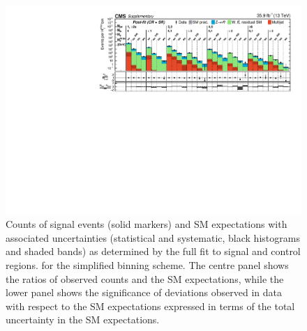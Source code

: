 \begin{figure}[h!]
  \centering
  \includegraphics[width=0.95\linewidth]{Supplementary/SimplifiedBinning_results_full-fit-bg_aux} 
  \caption{Counts of signal events (solid markers) and SM expectations
    with associated uncertainties (statistical and systematic, black
    histograms and shaded bands) 
    as determined by the full fit to signal and control regions.
    for the simplified binning scheme.
    The centre panel shows the ratios of
    observed counts and the SM expectations, while the lower panel
    shows the significance of deviations observed in data with respect
    to the SM expectations expressed in terms of the total uncertainty
    in the SM expectations.
    }
  \label{fig:aggregated_results}
\end{figure}

